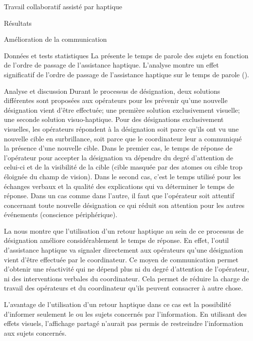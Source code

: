 \documentclass[myfrancais,ngerman,english,frenchb]{mythesis}
\begin{document}
\begin{mychapter}{Travail collaboratif assisté par haptique}
\begin{mysection}{Résultats}
\begin{mysubsection}{Amélioration de la communication}
\begin{mysubsubsection}{Données et tests statistiques}
					La  présente le temps de parole des sujets  en fonction de l'ordre de passage de l'assistance haptique.
					L'analyse montre un effet significatif de l'ordre de passage de l'assistance haptique sur le temps de parole  ().
				\end{mysubsubsection}
				\begin{mysubsubsection}{Analyse et discussion}
					Durant le processus de désignation, deux solutions différentes sont proposées aux opérateurs pour les prévenir qu'une nouvelle désignation vient d'être effectuée; une première solution exclusivement visuelle; une seconde solution visuo-haptique.
					Pour des désignations exclusivement visuelles, les opérateurs répondent à la désignation soit parce qu'ils ont vu une nouvelle cible en surbrillance, soit parce que le coordinateur leur a communiqué la présence d'une nouvelle cible.
					Dans le premier cas, le temps de réponse de l'opérateur pour accepter la désignation va dépendre du degré d'attention de celui-ci et de la visibilité de la cible (cible masquée par des atomes ou cible trop éloignée du champ de vision).
					Dans le second cas, c'est le temps utilisé pour les échanges verbaux et la qualité des explications qui va déterminer le temps de réponse.
					Dans un cas comme dans l'autre, il faut que l'opérateur soit attentif concernant toute nouvelle désignation ce qui réduit son attention pour les autres événements (conscience périphérique).

					La  nous montre que l'utilisation d'un retour haptique au sein de ce processus de désignation améliore considérablement le temps de réponse.
					En effet, l'outil d'assistance haptique va signaler directement aux opérateurs qu'une désignation vient d'être effectuée par le coordinateur.
					Ce moyen de communication permet d'obtenir une réactivité qui ne dépend plus ni du degré d'attention de l'opérateur, ni des interventions verbales du coordinateur.
					Cela permet de réduire la charge de travail des opérateurs et du coordinateur qu'ils peuvent consacrer à autre chose.

					L'avantage de l'utilisation d'un retour haptique dans ce cas est la possibilité d'informer seulement le ou les sujets concernés par l'information.
					En utilisant des effets visuels, l'affichage partagé n'aurait pas permis de restreindre l'information aux sujets concernés.


\end{mysubsubsection}
\end{mysubsection}
\end{mysection}
\end{mychapter}
\end{document}
